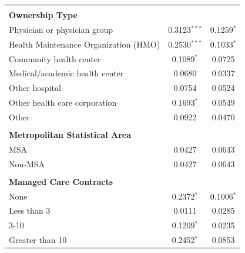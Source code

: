 \documentclass[12pt]{report}
\begin{document}
{\begin{center}
\begin{longtable}{lSS[table-format = 0.4]}
                                       &                          &                           \\
\textbf{Ownership Type}                &                          &                           \\
Physician or physician group           & 0.3123$^{***}$               & 0.1259$^{*}$                \\
Health Maintenance Organization (HMO)  & 0.2530$^{***}$               & 0.1033$^{*}$                \\
Community health center                & 0.1089$^{*}$               & 0.0725                    \\
Medical/academic health center         & 0.0680                   & 0.0337                    \\
Other hospital                         & 0.0754                   & 0.0524                    \\
Other health care corporation          & 0.1693$^{*}$               & 0.0549                    \\
Other                                  & 0.0922                   & 0.0470                    \\
                                       &                          &                           \\
\textbf{Metropolitan Statistical Area} &                          &                           \\
MSA                                    & 0.0427                   & 0.0643                    \\
Non-MSA                                & 0.0427                   & 0.0643                    \\
                                       &                          &                           \\
\textbf{Managed Care Contracts}        &                          &                           \\
None                                   & 0.2372$^{*}$               & 0.1006$^{*}$                \\
Less than 3                            & 0.0111                   & 0.0285                    \\
3-10                                   & 0.1209$^{*}$               & 0.0235                    \\
Greater than 10                        & 0.2452$^{*}$               & 0.0853                    \\

\end{longtable}
\end{center}}
\end{document}
